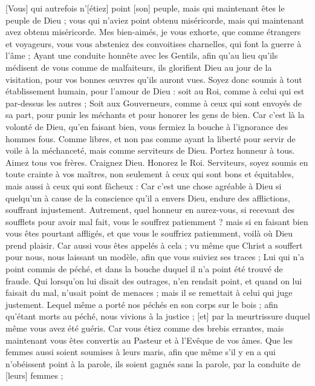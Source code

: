 \begin{multicols}{2}
[Vous] qui autrefois n'[étiez] point [son] peuple, mais qui maintenant êtes le peuple de Dieu ; vous qui n'aviez point obtenu miséricorde, mais qui maintenant avez obtenu miséricorde.
Mes bien-aimés, je vous exhorte, que comme étrangers et voyageurs, vous vous absteniez des convoitises charnelles, qui font la guerre à l'âme ;
Ayant une conduite honnête avec les Gentils, afin qu'au lieu qu'ils médisent de vous comme de malfaiteurs, ils glorifient Dieu au jour de la visitation, pour vos bonnes œuvres qu'ils auront vues.
Soyez donc soumis à tout établissement humain, pour l'amour de Dieu : soit au Roi, comme à celui qui est par-dessus les autres ;
Soit aux Gouverneurs, comme à ceux qui sont envoyés de sa part, pour punir les méchants et pour honorer les gens de bien.
Car c'est là la volonté de Dieu, qu'en faisant bien, vous fermiez la bouche à l'ignorance des hommes fous.
Comme libres, et non pas comme ayant la liberté pour servir de voile à la méchanceté, mais comme serviteurs de Dieu.
Portez honneur à tous. Aimez tous vos frères. Craignez Dieu. Honorez le Roi.
Serviteurs, soyez soumis en toute crainte à vos maîtres, non seulement à ceux qui sont bons et équitables, mais aussi à ceux qui sont fâcheux :
Car c'est une chose agréable à Dieu si quelqu'un à cause de la conscience qu'il a envers Dieu, endure des afflictions, souffrant injustement.
Autrement, quel honneur en aurez-vous, si recevant des soufflets pour avoir mal fait, vous le souffrez patiemment ? mais si en faisant bien vous êtes pourtant affligés, et que vous le souffriez patiemment, voilà où Dieu prend plaisir.
Car aussi vous êtes appelés à cela ; vu même que Christ a souffert pour nous, nous laissant un modèle, afin que vous suiviez ses traces ;
Lui qui n'a point commis de péché, et dans la bouche duquel il n'a point été trouvé de fraude.
Qui lorsqu'on lui disait des outrages, n'en rendait point, et quand on lui faisait du mal, n'usait point de menaces ; mais il se remettait à celui qui juge justement.
Lequel même a porté nos péchés en son corps sur le bois ; afin qu'étant morts au péché, nous vivions à la justice ; [et] par la meurtrissure duquel même vous avez été guéris.
Car vous étiez comme des brebis errantes, mais maintenant vous êtes convertis au Pasteur et à l'Evêque de vos âmes.
\VerseOne{}Que les femmes aussi soient soumises à leurs maris, afin que même s'il y en a qui n'obéissent point à la parole, ils soient gagnés sans la parole, par la conduite de [leurs] femmes ;

\end{multicols}
